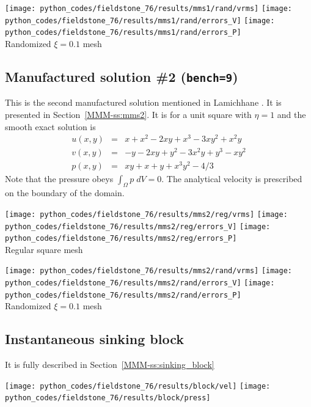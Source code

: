 \begin{center}
\texttt{[image: python\_codes/fieldstone\_76/results/mms1/rand/vrms]}
\texttt{[image: python\_codes/fieldstone\_76/results/mms1/rand/errors\_V]}
\texttt{[image: python\_codes/fieldstone\_76/results/mms1/rand/errors\_P]}\\
{\captionfont Randomized $\xi=0.1$ mesh}
\end{center}

\subsection*{Manufactured solution \#2 ({\tt bench=9})}

This is the second manufactured solution 
mentioned in Lamichhane \cite{lami17}. It is presented in Section~\ref{MMM-ss:mms2}.
It is for a unit square with $\eta=1$ and the smooth exact solution is
\begin{eqnarray}
u(x,y) &=& x+x^2 - 2xy+x^3 - 3xy^2 + x^2y \\
v(x,y) &=& -y-2xy+y^2 -3x^2y + y^3 - xy^2 \\
p(x,y) &=& xy+x+y+x^3y^2 - 4/3
\end{eqnarray}
Note that the pressure obeys $\int_{\Omega} p \; dV = 0$. The analytical 
velocity is prescribed on the boundary of the domain. 

\begin{center}
\texttt{[image: python\_codes/fieldstone\_76/results/mms2/reg/vrms]}
\texttt{[image: python\_codes/fieldstone\_76/results/mms2/reg/errors\_V]}
\texttt{[image: python\_codes/fieldstone\_76/results/mms2/reg/errors\_P]}\\
{\captionfont Regular square mesh}
\end{center}

\begin{center}
\texttt{[image: python\_codes/fieldstone\_76/results/mms2/rand/vrms]}
\texttt{[image: python\_codes/fieldstone\_76/results/mms2/rand/errors\_V]}
\texttt{[image: python\_codes/fieldstone\_76/results/mms2/rand/errors\_P]}\\
{\captionfont Randomized $\xi=0.1$ mesh}
\end{center}


\subsection*{Instantaneous sinking block}

It is fully described in Section~\ref{MMM-ss:sinking_block}

\begin{center}
\texttt{[image: python\_codes/fieldstone\_76/results/block/vel]}
\texttt{[image: python\_codes/fieldstone\_76/results/block/press]}
\end{center}


